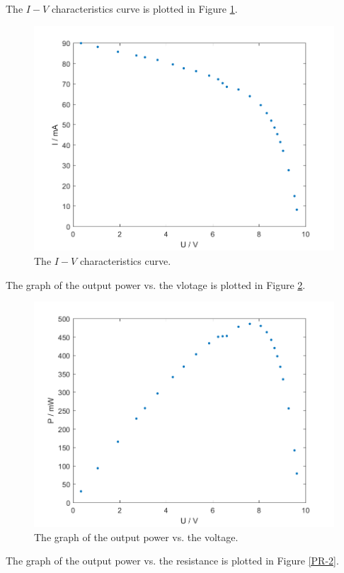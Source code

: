 The $I-V$ characteristics curve is plotted in Figure \ref{IV-2}.
\begin{figure}[H]
\centering
\includegraphics[scale=0.6]{IV2.png}
\caption{The $I-V$ characteristics curve.}
\label{IV-2}
\end{figure}
The graph of the output power vs. the vlotage is plotted in Figure \ref{PV-2}.
\begin{figure}[H]
\centering
\includegraphics[scale=0.6]{PV2.png}
\caption{The graph of the output power vs. the voltage.}
\label{PV-2}
\end{figure}
The graph of the output power vs. the resistance is plotted in Figure \ref{PR-2}.
